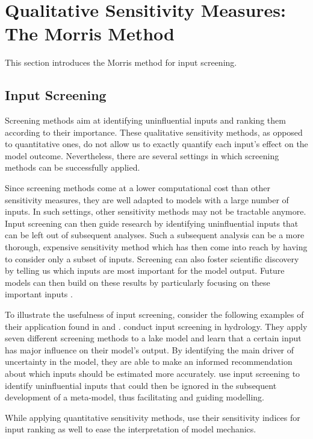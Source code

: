 \section{Qualitative Sensitivity Measures: The Morris Method} \label{comp_morris}

This section introduces the Morris method for input screening.

\subsection{Input Screening}

Screening methods aim at identifying uninfluential inputs and ranking them according to their importance. These qualitative sensitivity methods, as opposed to quantitative ones, do not allow us to exactly quantify each input's effect on the model outcome. Nevertheless, there are several settings in which screening methods can be successfully applied.

Since screening methods come at a lower computational cost than other sensitivity measures, they are well adapted to models with a large number of inputs. In such settings, other sensitivity methods may not be tractable anymore. Input screening can then guide research by identifying uninfluential inputs that can be left out of subsequent analyses. Such a subsequent analysis can be a more thorough, expensive sensitivity method which has then come into reach by having to consider only a subset of inputs. Screening can also foster scientific discovery by telling us which inputs are most important for the model output. Future models can then build on these results by particularly focusing on these important inputs \citep{R21}.

To illustrate the usefulness of input screening, consider the following examples of their application found in \citet{GPWMS17} and \citet{MMA18}. \citet{GPWMS17} conduct input screening in hydrology. They apply seven different screening methods to a lake model and learn that a certain input has major influence on their model's output. By identifying the main driver of uncertainty in the model, they are able to make an informed recommendation about which inputs should be estimated more accurately. \citet{MMA18} use input screening to identify uninfluential inputs that could then be ignored in the subsequent development of a meta-model, thus facilitating and guiding modelling.

While applying quantitative sensitivity methods, \citet{HMSW19} use their sensitivity indices for input ranking as well to ease the interpretation of model mechanics.

